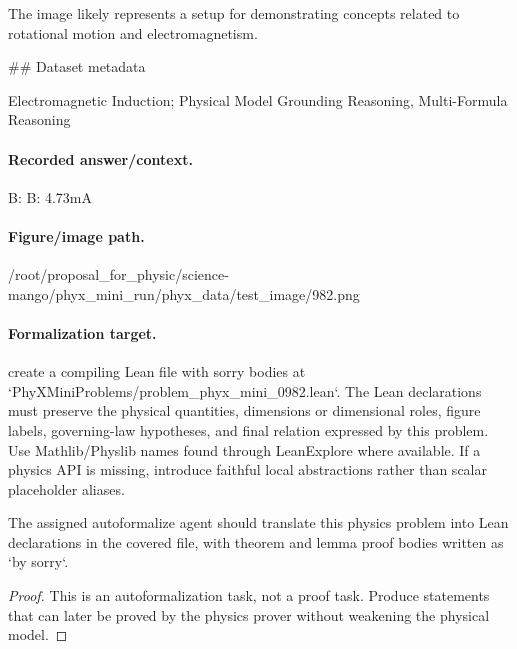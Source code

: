 The image likely represents a setup for demonstrating concepts related to rotational motion and electromagnetism.

\#\# Dataset metadata

Electromagnetic Induction; Physical Model Grounding Reasoning, Multi-Formula Reasoning

\paragraph{Recorded answer/context.}
B: B: 4.73mA

\paragraph{Figure/image path.}
/root/proposal\_for\_physic/science-mango/phyx\_mini\_run/phyx\_data/test\_image/982.png

\paragraph{Formalization target.}
create a compiling Lean file with sorry bodies at `PhyXMiniProblems/problem\_phyx\_mini\_0982.lean`. The Lean declarations must preserve the physical quantities, dimensions or dimensional roles, figure labels, governing-law hypotheses, and final relation expressed by this problem.
Use Mathlib/Physlib names found through LeanExplore where available. If a physics API is missing, introduce faithful local abstractions rather than scalar placeholder aliases.

\begin{theorem}
\label{thm:physics:phyx_mini_0982:target}
The assigned autoformalize agent should translate this physics problem into Lean declarations in the covered file, with theorem and lemma proof bodies written as `by sorry`.
\end{theorem}
\begin{proof}
This is an autoformalization task, not a proof task. Produce statements that can later be proved by the physics prover without weakening the physical model.
\end{proof}

